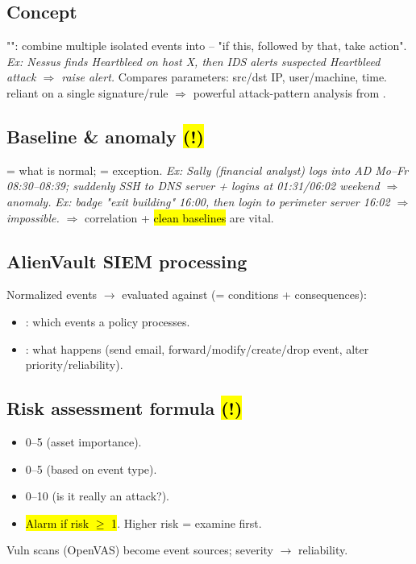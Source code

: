 \subsection{Concept}
"": combine multiple isolated events into  -- "if this, followed by that, take action". \textit{Ex: Nessus finds Heartbleed on host X, then IDS alerts suspected Heartbleed attack $\Rightarrow$ raise alert.}
Compares parameters: src/dst IP, user/machine, time.  reliant on a single signature/rule $\Rightarrow$ powerful attack-pattern analysis from .

\subsection{Baseline \& anomaly \hl{(!)}}
 = what is normal;  = exception. \textit{Ex: Sally (financial analyst) logs into AD Mo--Fr 08:30--08:39; suddenly SSH to DNS server + logins at 01:31/06:02 weekend $\Rightarrow$ anomaly.} \textit{Ex: badge "exit building" 16:00, then login to perimeter server 16:02 $\Rightarrow$ impossible.} $\Rightarrow$ correlation + \hl{clean baselines} are vital.

\subsection{AlienVault SIEM processing}
Normalized events $\to$ evaluated against  (= conditions + consequences):
\begin{itemize}
\item {}: which events a policy processes.
\item {}: what happens (send email, forward/modify/create/drop event, alter priority/reliability).
\end{itemize}

\subsection{Risk assessment formula \hl{(!)}}
\begin{itemize}
\item {} 0--5 (asset importance).
\item {} 0--5 (based on event type).
\item {} 0--10 (is it really an attack?).
\item \hl{Alarm if risk $\geq$ 1}. Higher risk = examine first.
\end{itemize}
Vuln scans (OpenVAS) become event sources; severity $\to$ reliability.

